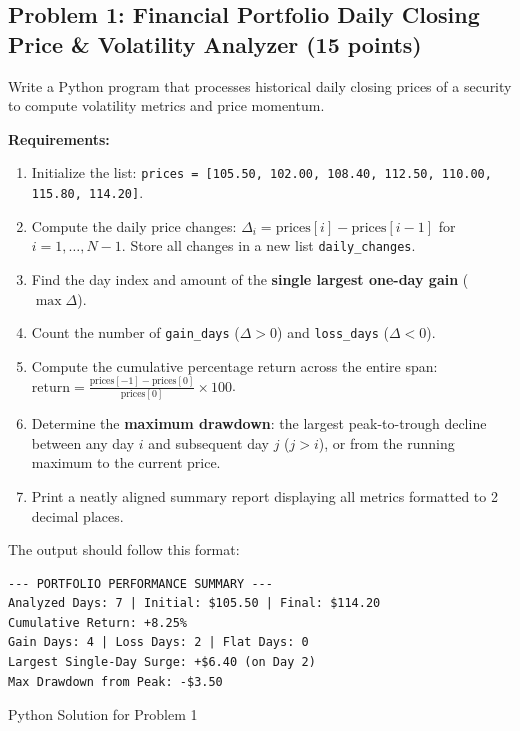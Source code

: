 \documentclass[11pt,a4paper]{article}
\begin{document}
\subsection*{Problem 1: Financial Portfolio Daily Closing Price \& Volatility Analyzer (15 points)}
Write a Python program that processes historical daily closing prices of a security to compute volatility metrics and price momentum.

\textbf{Requirements:}
\begin{enumerate}[leftmargin=2em,label=\arabic*.,itemsep=1pt]
  \item Initialize the list: \texttt{prices = [105.50, 102.00, 108.40, 112.50, 110.00, 115.80, 114.20]}.
  \item Compute the daily price changes: $\Delta_i = \text{prices}[i] - \text{prices}[i-1]$ for $i = 1, \dots, N-1$. Store all changes in a new list \texttt{daily\_changes}.
  \item Find the day index and amount of the \textbf{single largest one-day gain} ($\max \Delta$).
  \item Count the number of \texttt{gain\_days} ($\Delta > 0$) and \texttt{loss\_days} ($\Delta < 0$).
  \item Compute the cumulative percentage return across the entire span: $\text{return} = \frac{\text{prices}[-1] - \text{prices}[0]}{\text{prices}[0]} \times 100$.
  \item Determine the \textbf{maximum drawdown}: the largest peak-to-trough decline between any day $i$ and subsequent day $j$ ($j > i$), or from the running maximum to the current price.
  \item Print a neatly aligned summary report displaying all metrics formatted to 2 decimal places.
\end{enumerate}

The output should follow this format:
\begin{lstlisting}
--- PORTFOLIO PERFORMANCE SUMMARY ---
Analyzed Days: 7 | Initial: $105.50 | Final: $114.20
Cumulative Return: +8.25%
Gain Days: 4 | Loss Days: 2 | Flat Days: 0
Largest Single-Day Surge: +$6.40 (on Day 2)
Max Drawdown from Peak: -$3.50
\end{lstlisting}

\begin{answerbox}[height=13.2cm]{Python Solution for Problem 1}
\end{answerbox}

\newpage

\end{document}
